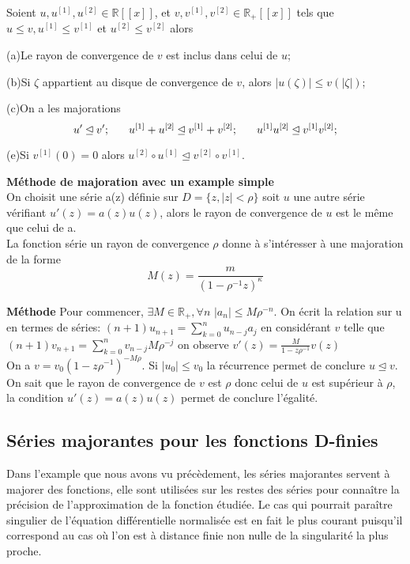 \documentclass[a4paper,10.5pt]{article}
\begin{document}
	\begin{proposition} Soient $u,u^{[1]},u^{[2]}\in \mathbb{R}[[x]]$, et $v,v^{[1]},v^{[2]} \in \mathbb{R}_{+}[[x]]$ tels que $u\leq v,u^{[1]}\leq v^{[1]}$ et $u^{[2]}\leq v^{[2]}$ alors
		
		(a)Le rayon de convergence de $v$ est inclus dans celui de $u$;
		
		(b)Si $\zeta$ appartient au disque de convergence de $v$, alors $|u(\zeta)|\leq v(|\zeta|)$;
		
		(c)On a les majorations
		\[u' \unlhd v'; \hspace{6mm} u^{[1]}+u^{[2]}\unlhd v^{[1]}+v^{[2]}; \hspace{6mm}u^{[1]}u^{[2]}\unlhd v^{[1]}v^{[2]}; \]
		
		(e)Si $v^{[1]}(0)=0$ alors $ u^{[2]} \circ u^{[1]} \unlhd v^{[2]}\circ v^{[1]}$.
		
	\end{proposition}
	
	\noindent\textbf{Méthode de majoration avec un example simple}\\
	On choisit une série a(z) définie sur $D=\{z,|z|<\rho\}$ soit $u$ une autre série vérifiant $u'(z)=a(z)u(z)$, alors le rayon de convergence de $u$ est le même que celui de a.\\
	La fonction série un rayon de convergence $\rho$ donne à s'intéresser à une majoration de la forme
	\[M(z)=\frac{m}{(1-\rho^{-1} z)^{\kappa}}\] 
	
	\noindent\textbf{Méthode} Pour commencer, $\exists M \in \mathbb{R}_{+}, \forall n$ $|a_{n}|\leq M \rho^{-n}$.
	On écrit la relation sur u en termes de séries: $(n+1)u_{n+1}=\sum_{k=0}^{n}u_{n-j}a_{j}$ en considérant $v$ telle que  $(n+1)v_{n+1}=\sum_{k=0}^{n}v_{n-j}M\rho^{-j}$ on observe $v'(z)=\frac{M}{1-z\rho^{-1}}v(z)$ \\
	On a $v=v_{0}(1-z\rho^{-1})^{-M\rho}$. Si $|u_{0}| \leq v_{0}$ la récurrence permet de conclure $ u\unlhd v$. On sait que le rayon de convergence de $v$ est $\rho$ donc celui de $u$ est supérieur à $\rho$, la condition $u'(z)=a(z)u(z)$ permet de conclure l'égalité.
	
	\subsection{Séries majorantes pour les fonctions D-finies}
	Dans l'example que nous avons vu précèdement, les séries majorantes servent à majorer des fonctions, elle sont utilisées sur les restes des séries pour connaître la précision de l'approximation de la fonction étudiée.
	Le cas qui pourrait paraître singulier de l'équation différentielle normalisée est en fait le plus courant puisqu'il correspond au cas où l'on est à distance finie non nulle de la singularité la plus proche.
	
\end{document}
